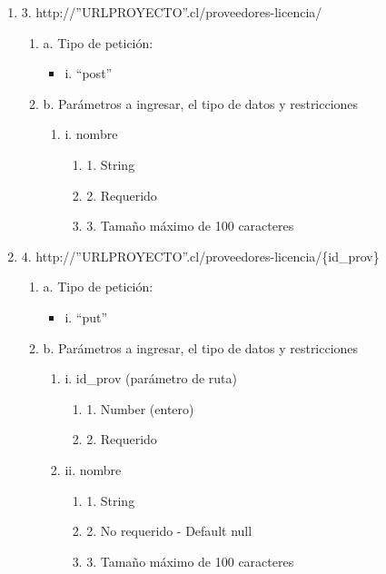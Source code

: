 \begin{enumerate}
    \item 3. http://”URLPROYECTO”.cl/proveedores-licencia/
    \begin{enumerate}
        \item a. Tipo de petición:
            \begin{itemize}
               \item i. “post”
            \end{itemize}
        \item b. Parámetros a ingresar, el tipo de datos y restricciones
            \begin{enumerate}
                \item i. nombre
                    \begin{enumerate}
                        \item 1. String
                        \item 2. Requerido
                        \item 3. Tamaño máximo de 100 caracteres
                    \end{enumerate}
            \end{enumerate}
    \end{enumerate}

    \item 4. http://”URLPROYECTO”.cl/proveedores-licencia/\{id\_prov\}
    \begin{enumerate}
        \item a. Tipo de petición:
            \begin{itemize}
               \item i. “put”
            \end{itemize}
        \item b. Parámetros a ingresar, el tipo de datos y restricciones
            \begin{enumerate}
                \item i. id\_prov (parámetro de ruta)
                    \begin{enumerate}
                        \item 1. Number (entero)
                        \item 2. Requerido
                    \end{enumerate}
                \item ii. nombre
                    \begin{enumerate}
                        \item 1. String
                        \item 2. No requerido - Default null
                        \item 3. Tamaño máximo de 100 caracteres
                    \end{enumerate}
            \end{enumerate}
    \end{enumerate}


\end{enumerate}
